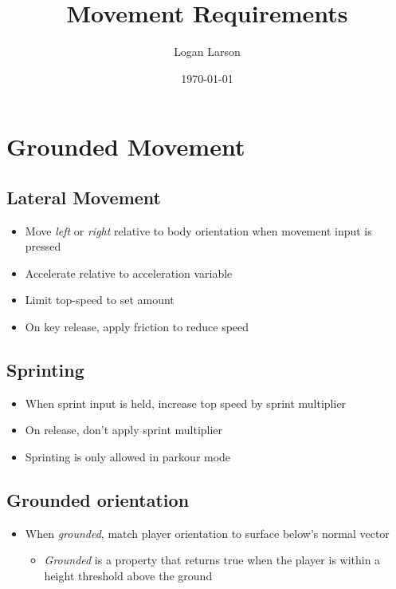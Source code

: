 \documentclass{article}
\title{Movement Requirements}
\author{Logan Larson}
\date{\today}
\begin{document}
\maketitle

\section{Grounded Movement}

    \subsection*{Lateral Movement}
    \begin{itemize}
        \item Move \emph{left} or \emph{right} relative to body orientation
            when movement input is pressed
        \item Accelerate relative to acceleration variable
        \item Limit top-speed to set amount
        \item On key release, apply friction to reduce speed
    \end{itemize}
    \subsection*{Sprinting}
    \begin{itemize}
        \item When sprint input is held, increase top speed by sprint multiplier
        \item On release, don't apply sprint multiplier
        \item Sprinting is only allowed in parkour mode
    \end{itemize}
    \subsection*{Grounded orientation}
    \begin{itemize}
        \item When \emph{grounded}, match player orientation to surface below's
            normal vector
            \begin{itemize}
                \item \emph{Grounded} is a property that returns true when the
                    player is within a height threshold above the ground
            \end{itemize}
    \end{itemize}
\end{document}
